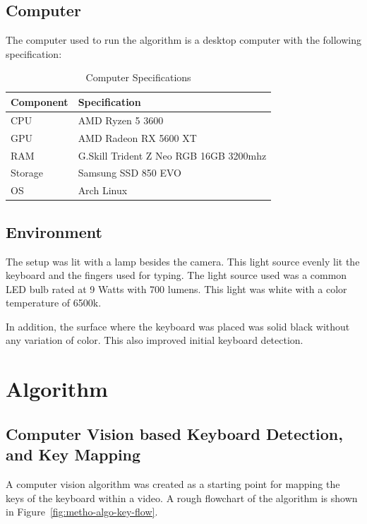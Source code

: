 \documentclass{report}
\begin{document}
\subsection{Computer}
The computer used to run the algorithm is a desktop computer with the following
specification:

\begin{table}[H]
	\small
	\centering
	\begin{tabular}{ p{} p{} }
		\toprule
		Component & Specification                          \\
		\midrule
		CPU       & AMD Ryzen 5 3600                       \\
		GPU       & AMD Radeon RX 5600 XT                  \\
		RAM       & G.Skill Trident Z Neo RGB 16GB 3200mhz \\
		Storage   & Samsung SSD 850 EVO                    \\
		OS        & Arch Linux                             \\
		\bottomrule
	\end{tabular}
	\caption{\label{tab:table-specs}Computer Specifications}
\end{table}

\subsection{Environment}
The setup was lit with a lamp besides the camera. This light source evenly lit
the keyboard and the fingers used for typing. The light source used was a common
LED bulb rated at 9 Watts with 700 lumens. This light was white with a color
temperature of 6500k.

In addition, the surface where the keyboard was placed was solid black
without any variation of color. This also improved initial keyboard detection.

\section{Algorithm}
\label{section:metho-algo}

\subsection{Computer Vision based Keyboard Detection, and Key Mapping}
\label{section:metho-algo-keyboard}

A computer vision algorithm was created as a starting point for mapping the keys
of the keyboard within a video. A rough flowchart of the algorithm is shown in
Figure~\ref{fig:metho-algo-key-flow}.
\end{document}
